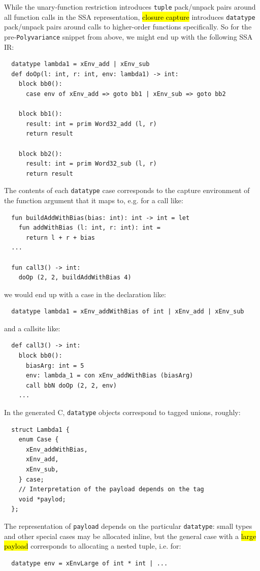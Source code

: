 \documentclass[leqno,11pt]{article}
\begin{document}
While the unary-function restriction introduces \texttt{tuple} pack/unpack pairs
around all function calls in the SSA representation, \hl{closure capture}
introduces \texttt{datatype} pack/unpack pairs around calls to higher-order
functions specifically. So for the pre-\texttt{Polyvariance} snippet from above,
we might end up with the following SSA IR:
\begin{verbatim}
  datatype lambda1 = xEnv_add | xEnv_sub
  def doOp(l: int, r: int, env: lambda1) -> int:
    block bb0():
      case env of xEnv_add => goto bb1 | xEnv_sub => goto bb2

    block bb1():
      result: int = prim Word32_add (l, r)
      return result

    block bb2():
      result: int = prim Word32_sub (l, r)
      return result
\end{verbatim}
The contents of each \texttt{datatype} case corresponds to the capture
environment of the function argument that it maps to, e.g. for a call like:
\begin{verbatim}
  fun buildAddWithBias(bias: int): int -> int = let
    fun addWithBias (l: int, r: int): int =
      return l + r + bias
  ...

  fun call3() -> int:
    doOp (2, 2, buildAddWithBias 4)
\end{verbatim}
we would end up with a case in the declaration like:
\begin{verbatim}
  datatype lambda1 = xEnv_addWithBias of int | xEnv_add | xEnv_sub
\end{verbatim}
and a callsite like:
\begin{verbatim}
  def call3() -> int:
    block bb0():
      biasArg: int = 5
      env: lambda_1 = con xEnv_addWithBias (biasArg)
      call bbN doOp (2, 2, env)
    ...
\end{verbatim}
In the generated C, \texttt{datatype} objects correspond to tagged unions,
roughly:
\begin{verbatim}
  struct Lambda1 {
    enum Case {
      xEnv_addWithBias,
      xEnv_add,
      xEnv_sub,
    } case;
    // Interpretation of the payload depends on the tag
    void *paylod;
  };
\end{verbatim}
The representation of \texttt{payload} depends on the particular
\texttt{datatype}: small types and other special cases may be allocated inline,
but the general case with a \hl{large payload} corresponds to allocating a
nested tuple, i.e. for:
\begin{verbatim}
  datatype env = xEnvLarge of int * int | ...
\end{verbatim}
\end{document}
